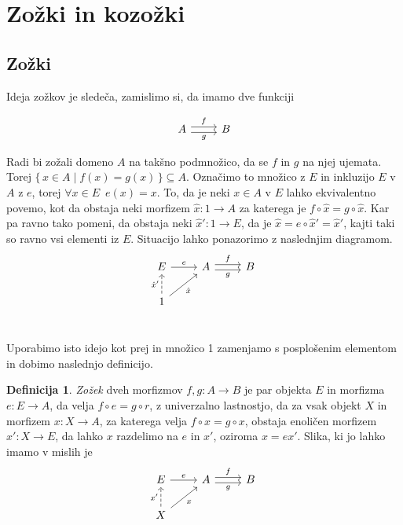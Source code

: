 \documentclass[12pt,a4paper]{book}
\theoremstyle{definition}
\newtheorem{definicija}{Definicija}[chapter]
\theoremstyle{plain}
\theoremstyle{definition}
\theoremstyle{remark}
\renewcommand{\set}[1]{\{\,#1\,\}}
\begin{document}
\section{Zožki in kozožki}

\subsection{Zožki}
Ideja zožkov je sledeča, zamislimo si, da imamo dve funkciji

$$\begin{tikzcd}
A \ar[r, shift left, "f"] \ar[r, shift right, "g"'] & B 
\end{tikzcd}$$

Radi bi zožali domeno $A$ na takšno podmnožico, da se $f$ in $g$ na njej ujemata. Torej $\set{x \in A \mid f(x) = g(x)} \subseteq A$. Označimo to množico z $E$ in inkluzijo $E$ v $A$ z $e$, torej $\forall x \in E \enspace e(x)= x $. To, da je neki $x \in A$ v $E$ lahko ekvivalentno povemo, kot da obstaja neki morfizem $\hat{x} : 1 \to A$ za katerega je $f \circ \hat{x} = g \circ \hat{x}$. Kar pa ravno tako pomeni, da obstaja neki $\hat{x}' : 1 \to E$, da je $\hat{x} = e \circ \hat{x}' = \hat{x}'$, kajti taki so ravno vsi elementi iz $E$. Situacijo lahko ponazorimo z naslednjim diagramom.
$$\begin{tikzcd}
E \ar[r, "e"] & A \ar[r, shift left, "f"] \ar[r, shift right, "g"'] & B \\
1 \ar[u, dashed, "\hat{x}'"] \ar[ur, "\hat{x}"'] \\
\end{tikzcd}$$

Uporabimo isto idejo kot prej in množico 1 zamenjamo s posplošenim elementom in dobimo naslednjo definicijo.

\begin{definicija}
\textit{Zožek} dveh morfizmov $f, g : A \to B$ je par objekta $E$ in morfizma $e : E \to A$, da velja $f \circ e = g \circ r$, z univerzalno lastnostjo, da za vsak objekt $X$ in morfizem $x : X \to A$, za katerega velja $f \circ x = g \circ x$, obstaja enoličen morfizem $x' : X \to E$, da lahko $x$ razdelimo na $e$ in $x'$, oziroma $x = ex'$.
Slika, ki jo lahko imamo v mislih je
$$\begin{tikzcd}
E \ar[r, "e"] & A \ar[r, shift left, "f"] \ar[r, shift right, "g"'] & B \\
X \ar[u, dashed, "x'"] \ar[ur, "x"']
\end{tikzcd}$$

\end{definicija}
\end{document}
